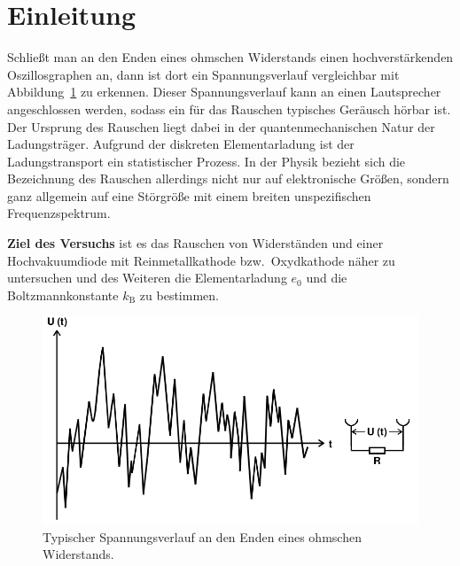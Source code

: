 

\section{Einleitung}

Schließt man an den Enden eines ohmschen Widerstands einen hochverstärkenden
Oszillosgraphen an, dann ist dort ein Spannungsverlauf vergleichbar mit
Abbildung~\ref{fig:rauschen} zu erkennen. Dieser Spannungsverlauf kann an
einen Lautsprecher angeschlossen werden, sodass ein für das Rauschen typisches
Geräusch hörbar ist. Der Ursprung des Rauschen liegt dabei in der
quantenmechanischen Natur der Ladungsträger. Aufgrund der diskreten
Elementarladung ist der Ladungstransport ein statistischer Prozess.
In der Physik bezieht sich die Bezeichnung des Rauschen allerdings nicht nur
auf elektronische Größen, sondern ganz allgemein auf eine Störgröße mit einem
breiten unspezifischen Frequenzspektrum.

\textbf{Ziel des Versuchs} ist es das Rauschen von Widerständen und einer
Hochvakuumdiode mit Reinmetallkathode bzw.~Oxydkathode näher zu untersuchen und
des Weiteren die Elementarladung $e_0$ und die Boltzmannkonstante $k_\text{B}$
zu bestimmen.

\begin{figure}[htpb]
  \centering
  \includegraphics[scale=0.3]{bilder/rauschen.png}
  \caption{Typischer Spannungsverlauf an den Enden eines ohmschen Widerstands.}
\label{fig:rauschen}
\end{figure}
